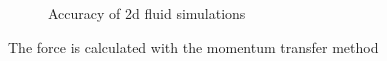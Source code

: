 \documentclass{article}
\begin{document}
\begin{figure}[!t]
\caption{Accuracy of 2d fluid simulations }
\label{fig:bouncing_balls_error_3}
\end{figure}

The force is calculated with the momentum transfer method \cite{guo2013lattice}
\end{document}
